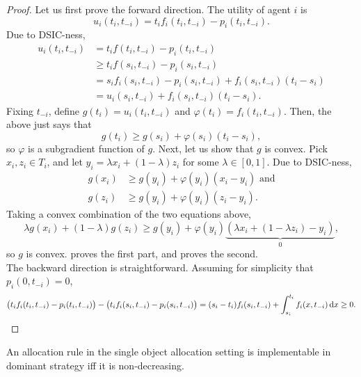 		\begin{proof}
			Let us first prove the forward direction. The utility of agent $i$ is
			\[ u_i(t_i,t_{-i}) = t_if_i(t_i,t_{-i}) - p_i(t_i,t_{-i}). \]
			Due to DSIC-ness,
			\begin{align*}
				u_i(t_i,t_{-i}) &= t_if(t_i,t_{-i}) - p_i(t_i,t_{-i}) \\
					&\ge t_i f(s_i,t_{-i}) - p_i(s_i,t_{-i}) \\
					&= s_if_i(s_i,t_{-i}) - p_i(s_i,t_{-i}) + f_i(s_i,t_{-i})(t_i - s_i) \\
					&= u_i(s_i,t_{-i}) + f_i(s_i,t_{-i}) (t_i-s_i).
			\end{align*}
			Fixing $t_{-i}$, define $g(t_i) = u_i(t_i,t_{-i})$ and $\varphi(t_i) = f_i(t_i,t_{-i})$. Then, the above just says that
			\[ g(t_i) \ge g(s_i) + \varphi(s_i) (t_i-s_i), \]
			so $\varphi$ is a subgradient function of $g$. Next, let us show that $g$ is convex. Pick $x_i,z_i \in T_i$, and let $y_i = \lambda x_i + (1-\lambda) z_i$ for some $\lambda \in [0,1]$. Due to DSIC-ness,
			\begin{align*}
				g(x_i) &\ge g(y_i) + \varphi(y_i)(x_i-y_i) \text{ and} \\
				g(z_i) &\ge g(y_i) + \varphi(y_i)(z_i-y_i).
			\end{align*}
			Taking a convex combination of the two equations above,
			\[ \lambda g(x_i) + (1-\lambda) g(z_i) \ge g(y_i) + \varphi(y_i)\underbrace{(\lambda x_i + (1-\lambda z_i) - y_i)}_{0}, \]
			so $g$ is convex.  proves the first part, and  proves the second.\\

			The backward direction is straightforward. Assuming for simplicity that $p_i(0,t_{-i}) = 0$,
			\[ \left(t_if_i(t_i,t_{-i}) - p_i(t_i,t_{-i})\right) - \left(t_if_i(s_i,t_{-i}) - p_i(s_i,t_{-i})\right) = (s_i-t_i)f_i(s_i,t_{-i}) + \int_{s_i}^{t_i} f_i(x,t_{-i}) \dif x \ge 0. \qedhere \]
		\end{proof}

		\begin{fcor}
			An allocation rule in the single object allocation setting is implementable in dominant strategy iff it is non-decreasing.
		\end{fcor}

